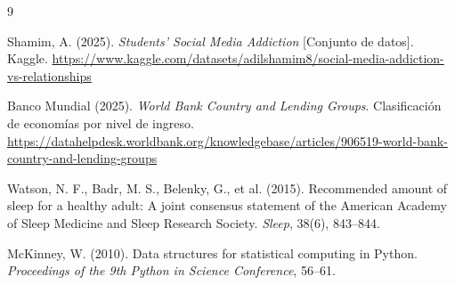 \documentclass[10pt,a4paper]{article}
\begin{document}
\begin{thebibliography}{9}
\small

Shamim, A. (2025). \textit{Students' Social Media Addiction} [Conjunto de datos]. Kaggle.
\url{https://www.kaggle.com/datasets/adilshamim8/social-media-addiction-vs-relationships}

Banco Mundial (2025). \textit{World Bank Country and Lending Groups}. Clasificación de economías por
nivel de ingreso.
\url{https://datahelpdesk.worldbank.org/knowledgebase/articles/906519-world-bank-country-and-lending-groups}

Watson, N. F., Badr, M. S., Belenky, G., et al. (2015). Recommended amount of sleep for a healthy adult:
A joint consensus statement of the American Academy of Sleep Medicine and Sleep Research Society.
\textit{Sleep}, 38(6), 843--844.

McKinney, W. (2010). Data structures for statistical computing in Python. \textit{Proceedings of the 9th
Python in Science Conference}, 56--61.

\end{thebibliography}
\end{document}
